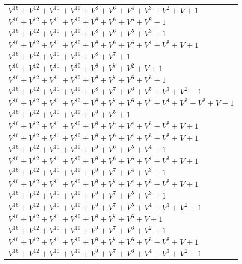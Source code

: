 \documentclass[12pt]{article}
\begin{document}
\begin{adjustwidth}{-4cm}{}
\begin{center}
\begin{longtable}{|l|}
$V^{16}  +V^{12}  +V^{11}  +V^{10}  +V^{8}  +V^{6}  +V^{4}  +V^{3}  +V^{2}  + V + 1$ \\
$V^{16}  +V^{12}  +V^{11}  +V^{10}  +V^{8}  +V^{6}  +V^{5}  +V^{2}  + 1$ \\
$V^{16}  +V^{12}  +V^{11}  +V^{10}  +V^{8}  +V^{6}  +V^{5}  +V^{3}  + 1$ \\
$V^{16}  +V^{12}  +V^{11}  +V^{10}  +V^{8}  +V^{6}  +V^{5}  +V^{4}  +V^{2}  + V + 1$ \\
$V^{16}  +V^{12}  +V^{11}  +V^{10}  +V^{8}  +V^{7}  + 1$ \\
$V^{16}  +V^{12}  +V^{11}  +V^{10}  +V^{8}  +V^{7}  +V^{2}  + V + 1$ \\
$V^{16}  +V^{12}  +V^{11}  +V^{10}  +V^{8}  +V^{7}  +V^{6}  +V^{3}  + 1$ \\
$V^{16}  +V^{12}  +V^{11}  +V^{10}  +V^{8}  +V^{7}  +V^{6}  +V^{5}  +V^{3}  +V^{2}  + 1$ \\
$V^{16}  +V^{12}  +V^{11}  +V^{10}  +V^{8}  +V^{7}  +V^{6}  +V^{5}  +V^{4}  +V^{3}  +V^{2}  + V + 1$ \\
$V^{16}  +V^{12}  +V^{11}  +V^{10}  +V^{9}  +V^{5}  + 1$ \\
$V^{16}  +V^{12}  +V^{11}  +V^{10}  +V^{9}  +V^{5}  +V^{4}  +V^{3}  +V^{2}  + V + 1$ \\
$V^{16}  +V^{12}  +V^{11}  +V^{10}  +V^{9}  +V^{6}  +V^{4}  +V^{3}  +V^{2}  + V + 1$ \\
$V^{16}  +V^{12}  +V^{11}  +V^{10}  +V^{9}  +V^{6}  +V^{5}  +V^{4}  + 1$ \\
$V^{16}  +V^{12}  +V^{11}  +V^{10}  +V^{9}  +V^{6}  +V^{5}  +V^{4}  +V^{3}  + V + 1$ \\
$V^{16}  +V^{12}  +V^{11}  +V^{10}  +V^{9}  +V^{7}  +V^{4}  +V^{3}  + 1$ \\
$V^{16}  +V^{12}  +V^{11}  +V^{10}  +V^{9}  +V^{7}  +V^{4}  +V^{3}  +V^{2}  + V + 1$ \\
$V^{16}  +V^{12}  +V^{11}  +V^{10}  +V^{9}  +V^{7}  +V^{5}  +V^{3}  + 1$ \\
$V^{16}  +V^{12}  +V^{11}  +V^{10}  +V^{9}  +V^{7}  +V^{5}  +V^{4}  +V^{3}  +V^{2}  + 1$ \\
$V^{16}  +V^{12}  +V^{11}  +V^{10}  +V^{9}  +V^{7}  +V^{6}  + V + 1$ \\
$V^{16}  +V^{12}  +V^{11}  +V^{10}  +V^{9}  +V^{7}  +V^{6}  +V^{2}  + 1$ \\
$V^{16}  +V^{12}  +V^{11}  +V^{10}  +V^{9}  +V^{7}  +V^{6}  +V^{3}  +V^{2}  + V + 1$ \\
$V^{16}  +V^{12}  +V^{11}  +V^{10}  +V^{9}  +V^{7}  +V^{6}  +V^{4}  +V^{3}  +V^{2}  + 1$ \\

\end{longtable}
\end{center}
\end{adjustwidth}
\end{document}
